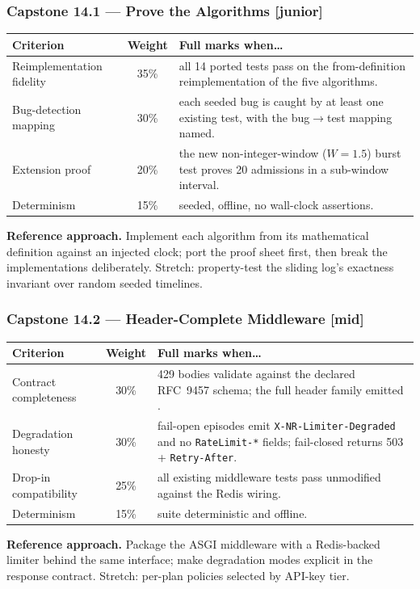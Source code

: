 \subsubsection*{Capstone 14.1 --- Prove the Algorithms [junior]}
\begin{center}\small
\begin{tabularx}{\textwidth}{l c X}
\toprule
\textbf{Criterion} & \textbf{Weight} & \textbf{Full marks when\ldots} \\
\midrule
Reimplementation fidelity & 35\% & all 14 ported tests pass on the from-definition reimplementation of the five algorithms. \\
Bug-detection mapping & 30\% & each seeded bug is caught by at least one existing test, with the bug$\to$test mapping named. \\
Extension proof & 20\% & the new non-integer-window ($W{=}1.5$) burst test proves 20 admissions in a sub-window interval. \\
Determinism & 15\% & seeded, offline, no wall-clock assertions. \\
\bottomrule
\end{tabularx}
\end{center}
\textbf{Reference approach.} Implement each algorithm from its mathematical
definition against an injected clock; port the proof sheet first, then
break the implementations deliberately. Stretch: property-test the sliding
log's exactness invariant over random seeded timelines.

\subsubsection*{Capstone 14.2 --- Header-Complete Middleware [mid]}
\begin{center}\small
\begin{tabularx}{\textwidth}{l c X}
\toprule
\textbf{Criterion} & \textbf{Weight} & \textbf{Full marks when\ldots} \\
\midrule
Contract completeness & 30\% & 429 bodies validate against the declared RFC~9457 schema; the full header family emitted \cite{rfc9457, ietf_ratelimit_headers}. \\
Degradation honesty & 30\% & fail-open episodes emit \texttt{X-NR-Limiter-Degraded} and no \texttt{RateLimit-*} fields; fail-closed returns 503 + \texttt{Retry-After}. \\
Drop-in compatibility & 25\% & all existing middleware tests pass unmodified against the Redis wiring. \\
Determinism & 15\% & suite deterministic and offline. \\
\bottomrule
\end{tabularx}
\end{center}
\textbf{Reference approach.} Package the ASGI middleware with a Redis-backed
limiter behind the same interface; make degradation modes explicit in the
response contract. Stretch: per-plan policies selected by API-key tier.

